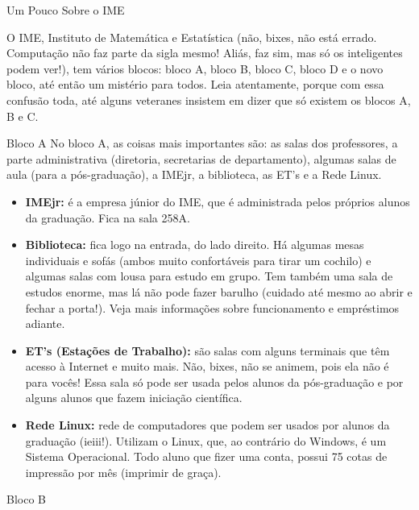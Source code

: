 \begin{secao}{Um Pouco Sobre o IME}

O IME, Instituto de Matemática e Estatística (não, bixes, não está errado.
Computação não faz parte da sigla mesmo! Aliás, faz sim, mas só os inteligentes
podem ver!), tem vários blocos: bloco A, bloco B, bloco C, bloco D e o
novo bloco, até então um mistério para todos. Leia atentamente, porque com essa
confusão toda, até alguns veteranes insistem em dizer que só existem os blocos
A, B e C.


\begin{subsecao}{Bloco A}
No bloco A, as coisas mais importantes são: as salas dos professores, a parte
administrativa (diretoria, secretarias de departamento), algumas salas de aula
(para a pós-graduação), a IMEjr, a biblioteca, as ET's e a Rede Linux.

\begin{itemize}

\item {\bf IMEjr:} é a empresa júnior do IME, que é administrada pelos próprios
alunos da graduação. Fica na sala 258A.

\item {\bf Biblioteca:} fica logo na entrada, do lado direito. Há algumas mesas
individuais e sofás (ambos muito confortáveis para tirar um cochilo) e algumas salas
com lousa para estudo em grupo. Tem também uma sala de estudos enorme, 
mas lá não pode fazer barulho (cuidado até mesmo ao abrir e fechar a porta!).
Veja mais informações sobre funcionamento e empréstimos adiante.

\item {\bf ET's (Estações de Trabalho):} são salas com alguns terminais que têm
acesso à Internet e muito mais. Não, bixes, não se animem, pois ela não é para
vocês! Essa sala só pode ser usada pelos alunos da pós-graduação e por alguns
alunos que fazem iniciação científica.

\item {\bf Rede Linux:} rede de computadores que podem ser usados por alunos
da graduação (ieiii!). Utilizam o Linux, que, ao contrário do Windows, é um
Sistema Operacional. Todo aluno que fizer uma conta, possui 75 cotas de impressão por mês 
(imprimir de graça).

\end{itemize}

\end{subsecao}

\begin{subsecao}{Bloco B}



\end{subsecao}
\end{secao}
